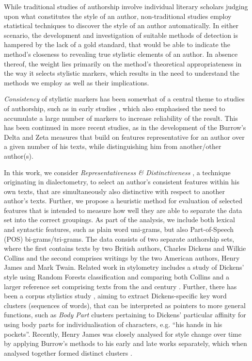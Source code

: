 \documentclass[a4paper,10pt,twoside,fleqn]{article}
\begin{document}
While traditional studies of authorship involve individual literary
scholars judging upon what constitutes the style of an author, 
non-traditional studies employ statistical techniques to discover 
the style of an author automatically. 
In either scenario, the development and investigation of suitable
methods of detection is hampered by the lack of a gold standard,
that would be able to indicate the method's closeness to 
revealing true stylistic elements of an author. 
In absence thereof, the weight lies primarily on the method's 
theoretical appropriateness in the way it selects stylistic 
markers, which results in the need to understand the methods 
we employ as well as their implications. 

\emph{Consistency} of stylistic markers has been somewhat of 
a central theme to studies of authorship, such as in early 
studies \cite{Mosteller2008}, which also emphasised  the need
to accumulate a large number of markers to increase reliability 
of the result.
This has been continued in more recent studies, as in 
the development of the Burrow's Delta \cite{Burrows2002delta} 
and Zeta \cite{Burrows2007all} measures that build on
features representative for an author over a given number
of his texts, while distinguishing him from another/other 
author(s). 


In this work, we consider \emph{Representativeness \& Distinctiveness}
\cite{prokic2012detecting}, a technique originating in dialectometry,
to select an author’s consistent features within his own texts, that
are simultaneously also distinctive with respect to another author’s texts.
Further, we propose a heuristic method for evaluation of 
selected features that is intended to measure how well they are able to
separate the data set into the correct groupings. 
As part of the analysis, we include both lexical and syntactic features, 
such as plain word uni-grams, but also Part-of-Speech (POS) 
bi-grams/tri-grams.
The data consists of two separate authorship sets, where the first
contains texts by two British authors, Charles Dickens and
Wilkie Collins and the second comprises writings by the two
American authors, Henry James and Mark Twain. 
Related work in stylometry includes a study of Dickens' style using
Random Forests classification and
comparing both Collins and a larger reference set comprising
texts from the   and  century \cite{Tabata2012}.
Further, there has been a corpus stylistics study \cite{mahlberg2007clusters},
aiming to extract Dickens-specific key word clusters (sequences of words), 
that can be interpreted as pointers to more general functions, such
as \emph{Body Part} clusters pertaining to Dickens' particular affinity for using 
body parts for individualisation of characters, e.g. ``his hands in his pockets''. 
Recently, Henry James was closely analysed for style change over time by
applying Burrow's methods to his early and late works separately, which 
when analysed together formed distinct clusters \cite{Hoover2012}. 
\end{document}
